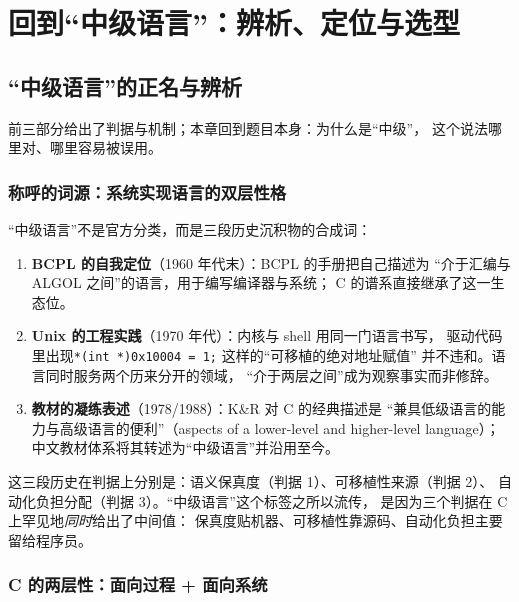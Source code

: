 \documentclass[12pt,a4paper,fontset=fandol]{ctexbook}
\begin{document}
\part{回到``中级语言''：辨析、定位与选型}

\chapter{``中级语言''的正名与辨析}

前三部分给出了判据与机制；本章回到题目本身：为什么是``中级''，
这个说法哪里对、哪里容易被误用。

\section{称呼的词源：系统实现语言的双层性格}

``中级语言''不是官方分类，而是三段历史沉积物的合成词：

\begin{enumerate}
  \item \textbf{BCPL 的自我定位}（1960 年代末）：BCPL 的手册把自己描述为
        ``介于汇编与 ALGOL 之间''的语言，用于编写编译器与系统；
        C 的谱系直接继承了这一生态位。
  \item \textbf{Unix 的工程实践}（1970 年代）：内核与 shell 用同一门语言书写，
        驱动代码里出现\texttt{*(int *)0x10004 = 1;} 这样的``可移植的绝对地址赋值''
        并不违和。语言同时服务两个历来分开的领域，
        ``介于两层之间''成为观察事实而非修辞。
  \item \textbf{教材的凝练表述}（1978/1988）：K\&R 对 C 的经典描述是
        ``兼具低级语言的能力与高级语言的便利''（aspects of a lower-level
        and higher-level language）；中文教材体系将其转述为``中级语言''并沿用至今。
\end{enumerate}

\begin{note}[title=与本书前八章的呼应]
这三段历史在判据上分别是：语义保真度（判据 1）、可移植性来源（判据 2）、
自动化负担分配（判据 3）。``中级语言''这个标签之所以流传，
是因为三个判据在 C 上罕见地\emph{同时}给出了中间值：
保真度贴机器、可移植性靠源码、自动化负担主要留给程序员。
\end{note}

\section{C 的两层性：面向过程 + 面向系统}
\end{document}
